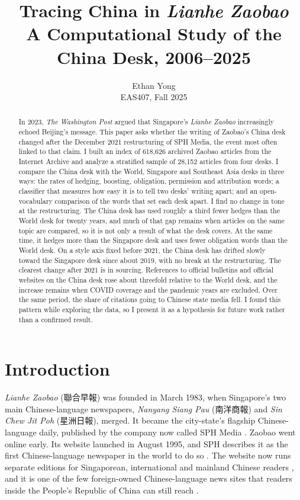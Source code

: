\documentclass[11pt]{article}
\title{Tracing China in \textit{Lianhe Zaobao}\\[6pt] \large A Computational Study of the China Desk, 2006--2025}
\author{Ethan Yong\\ EAS407, Fall 2025}
\date{}
\begin{document}
\maketitle

\begin{abstract}
\noindent In 2023, \textit{The Washington Post} argued that Singapore's \textit{Lianhe Zaobao} increasingly echoed Beijing's message. This paper asks whether the writing of Zaobao's China desk changed after the December 2021 restructuring of SPH Media, the event most often linked to that claim. I built an index of 618,626 archived Zaobao articles from the Internet Archive and analyze a stratified sample of 28,152 articles from four desks. I compare the China desk with the World, Singapore and Southeast Asia desks in three ways: the rates of hedging, boosting, obligation, permission and attribution words; a classifier that measures how easy it is to tell two desks' writing apart; and an open-vocabulary comparison of the words that set each desk apart. I find no change in tone at the restructuring. The China desk has used roughly a third fewer hedges than the World desk for twenty years, and much of that gap remains when articles on the same topic are compared, so it is not only a result of what the desk covers. At the same time, it hedges more than the Singapore desk and uses fewer obligation words than the World desk. On a style axis fixed before 2021, the China desk has drifted slowly toward the Singapore desk since about 2019, with no break at the restructuring. The clearest change after 2021 is in sourcing. References to official bulletins and official websites on the China desk rose about threefold relative to the World desk, and the increase remains when COVID coverage and the pandemic years are excluded. Over the same period, the share of citations going to Chinese state media fell. I found this pattern while exploring the data, so I present it as a hypothesis for future work rather than a confirmed result.
\end{abstract}

\section{Introduction}

\textit{Lianhe Zaobao} (聯合早報) was founded in March 1983, when Singapore's two main Chinese-language newspapers, \textit{Nanyang Siang Pau} (南洋商報) and \textit{Sin Chew Jit Poh} (星洲日報), merged. It became the city-state's flagship Chinese-language daily, published by the company now called SPH Media \cite{sph100}. Zaobao went online early. Its website launched in August 1995, and SPH describes it as the first Chinese-language newspaper in the world to do so \cite{sphhistory}. The website now runs separate editions for Singaporean, international and mainland Chinese readers \cite{zaobao}, and it is one of the few foreign-owned Chinese-language news sites that readers inside the People's Republic of China can still reach \cite{thinkchina}.
\end{document}
